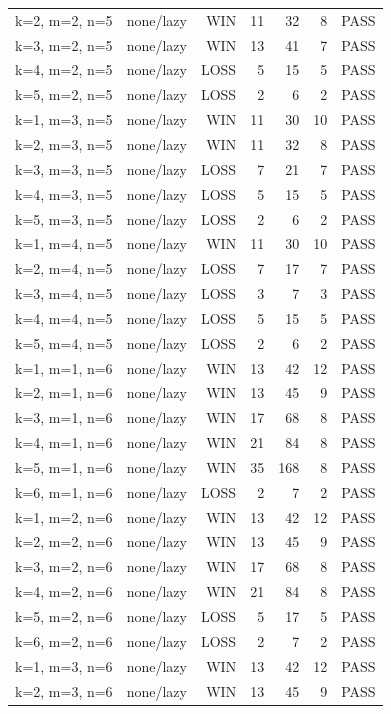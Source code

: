 \begin{longtable}{llrrrrl}
k=2, m=2, n=5 & none/lazy & WIN & 11 & 32 & 8 & PASS \\
k=3, m=2, n=5 & none/lazy & WIN & 13 & 41 & 7 & PASS \\
k=4, m=2, n=5 & none/lazy & LOSS & 5 & 15 & 5 & PASS \\
k=5, m=2, n=5 & none/lazy & LOSS & 2 & 6 & 2 & PASS \\
k=1, m=3, n=5 & none/lazy & WIN & 11 & 30 & 10 & PASS \\
k=2, m=3, n=5 & none/lazy & WIN & 11 & 32 & 8 & PASS \\
k=3, m=3, n=5 & none/lazy & LOSS & 7 & 21 & 7 & PASS \\
k=4, m=3, n=5 & none/lazy & LOSS & 5 & 15 & 5 & PASS \\
k=5, m=3, n=5 & none/lazy & LOSS & 2 & 6 & 2 & PASS \\
k=1, m=4, n=5 & none/lazy & WIN & 11 & 30 & 10 & PASS \\
k=2, m=4, n=5 & none/lazy & LOSS & 7 & 17 & 7 & PASS \\
k=3, m=4, n=5 & none/lazy & LOSS & 3 & 7 & 3 & PASS \\
k=4, m=4, n=5 & none/lazy & LOSS & 5 & 15 & 5 & PASS \\
k=5, m=4, n=5 & none/lazy & LOSS & 2 & 6 & 2 & PASS \\
k=1, m=1, n=6 & none/lazy & WIN & 13 & 42 & 12 & PASS \\
k=2, m=1, n=6 & none/lazy & WIN & 13 & 45 & 9 & PASS \\
k=3, m=1, n=6 & none/lazy & WIN & 17 & 68 & 8 & PASS \\
k=4, m=1, n=6 & none/lazy & WIN & 21 & 84 & 8 & PASS \\
k=5, m=1, n=6 & none/lazy & WIN & 35 & 168 & 8 & PASS \\
k=6, m=1, n=6 & none/lazy & LOSS & 2 & 7 & 2 & PASS \\
k=1, m=2, n=6 & none/lazy & WIN & 13 & 42 & 12 & PASS \\
k=2, m=2, n=6 & none/lazy & WIN & 13 & 45 & 9 & PASS \\
k=3, m=2, n=6 & none/lazy & WIN & 17 & 68 & 8 & PASS \\
k=4, m=2, n=6 & none/lazy & WIN & 21 & 84 & 8 & PASS \\
k=5, m=2, n=6 & none/lazy & LOSS & 5 & 17 & 5 & PASS \\
k=6, m=2, n=6 & none/lazy & LOSS & 2 & 7 & 2 & PASS \\
k=1, m=3, n=6 & none/lazy & WIN & 13 & 42 & 12 & PASS \\
k=2, m=3, n=6 & none/lazy & WIN & 13 & 45 & 9 & PASS \\

\end{longtable}
